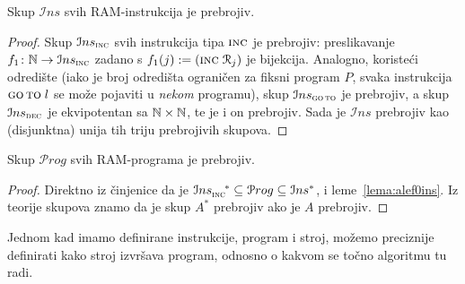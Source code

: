 \begin{lema}[{name=[prebrojivost skupa $\mathcal Ins$]}]\label{lema:alef0ins}
Skup $\mathcal Ins$ svih RAM-instrukcija je prebrojiv.
\end{lema}
\begin{proof}
Skup $\mathcal Ins_{\textsc{inc}}$ svih instrukcija tipa $\textsc{inc}$ je prebrojiv: preslikavanje $f_1\colon{\mathbb N}\to\mathcal Ins_{\textsc{inc}}$ zadano s $f_1(j):=(\textsc{inc}\;\mathcal R_{j})$ je bijekcija. Analogno, koristeći odredište (iako je broj odredišta ograničen za fiksni program $P$, svaka instrukcija $\textsc{go\,to}\;l$ se može pojaviti u \emph{nekom} programu), skup $\mathcal Ins_{\textsc{go\,to}}$ je prebrojiv, a skup $\mathcal Ins_{\textsc{dec}}$ je ek\-vi\-po\-ten\-tan sa ${\mathbb N}\times{\mathbb N}$, te je i on prebrojiv. Sada je $\mathcal Ins$ prebrojiv kao (disjunktna) unija tih triju prebrojivih skupova.
\end{proof}

\begin{korolar}[{name=[prebrojivost skupa $\mathcal Prog$]}]\label{kor:alef0prog}
Skup $\mathcal Prog$ svih RAM-programa je prebrojiv.
\end{korolar}
\begin{proof}
Direktno iz činjenice da je $\mathcal Ins_{\textsc{inc}}^{\quad*}\subseteq\mathcal Prog\subseteq\mathcal Ins^*$, i leme~\ref{lema:alef0ins}. Iz teorije skupova znamo da je skup $A^*$ prebrojiv ako je $A$ prebrojiv.
\end{proof}


Jednom kad imamo definirane instrukcije, program i stroj, možemo preciznije definirati kako stroj izvršava program, odnosno o kakvom se točno algoritmu tu radi.

